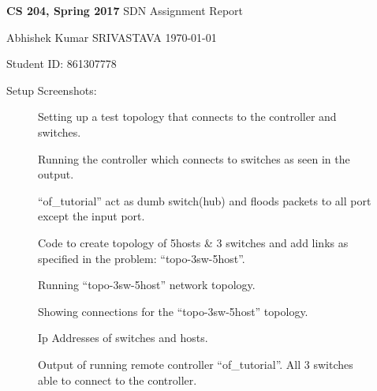 \documentclass[a4paper,11pt]{article}
\renewcommand{\maketitle}{%
	
	\Large
 	\textbf{CS 204, Spring 2017}
 	\hfill
 	SDN Assignment Report
 	\par
 	
	\Large
	Abhishek Kumar SRIVASTAVA
	\hfill
	\normalsize
	\today
 	\par
 	Student ID: 861307778
 	\par
 	

 	

 	
 	\hrulefill
 	\par \vspace{2ex}
 	}
\theoremstyle{quest}
\newenvironment{solution}[2][Solution]{\begin{trivlist}
		\item[\hskip \labelsep {\bfseries #1}\hskip \labelsep {\bfseries #2.}]}{\end{trivlist}}
\begin{document}
\thispagestyle{empty}
	
\maketitle

\begin{solution}
\textbf{Setup Screenshots}:
\begin{figure}[h]
	\centering
	\caption{Setting up	a test topology that connects to the controller and switches.}
\end{figure}	
\begin{figure}[h]
	\centering
	\caption{Running the controller which connects to switches as seen in the output.}
\end{figure}

\begin{figure}[h]
	\centering
	\caption{``of\_tutorial'' act as dumb switch(hub) and floods packets to all port except the input port.}
\end{figure}

\begin{figure}[h]
	\centering
	\caption{Code to create topology of 5hosts \& 3 switches and add links as specified in the problem: ``topo-3sw-5host''.}
\end{figure}

\begin{figure}[h]
	\centering
	\caption{Running ``topo-3sw-5host'' network topology.}
\end{figure}
\begin{figure}[h]
	\centering
	\caption{Showing connections for the ``topo-3sw-5host'' topology.}
\end{figure}
\begin{figure}[h]
	\centering
	\caption{Ip Addresses of switches and hosts.}
\end{figure}	
\begin{figure}[h]
	\centering
	\caption{Output of running remote controller ``of\_tutorial''. All 3 switches able to connect to the controller.}
\end{figure}
	

\end{solution}
\end{document}
